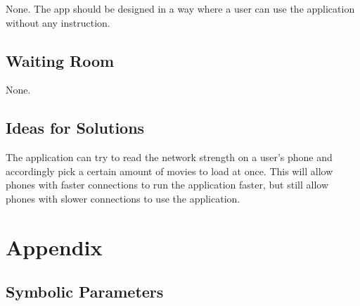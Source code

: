 \documentclass[12pt, titlepage]{article}
\begin{document}
None. The app should be designed in a way where a user can use the application without any instruction.

\subsection{Waiting Room}

None.

\subsection{Ideas for Solutions}

The application can try to read the network strength on a user’s phone and accordingly pick a certain amount of movies to load at once. This will allow phones with faster connections to run the application faster, but still allow phones with slower connections to use the application.





\newpage

\section{Appendix}



\subsection{Symbolic Parameters}
\end{document}
